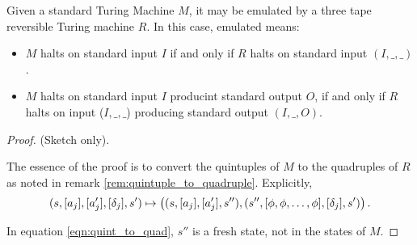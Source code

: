 \begin{theorem}\label{thm:reversible_turing_machine_emulates_standard}
  Given a standard Turing Machine $M$, it may be emulated by a three tape reversible
  Turing machine $R$. In this case, emulated means:
  \begin{itemize}
    \item $M$ halts on standard input $I$ if and only if $R$ halts on standard input $(I,\_,\_)$.
    \item $M$ halts on standard input $I$ producint standard output $O$,
      if and only if $R$ halts on input ($I,\_,\_$) producing standard output $(I,\_,O)$.
  \end{itemize}
\end{theorem}
\begin{proof}
  (Sketch only).

  The essence of the proof is to convert the quintuples of $M$ to the quadruples of
  $R$ as noted in remark \ref{rem:quintuple_to_quadruple}. Explicitly,
  \begin{align}
    (s,[a_j],[a'_j],[\delta_j],s') \mapsto \left((s,[a_j],[a'_j],s''),
          (s'',[\phi,\phi,\ldots,\phi],[\delta_j],s')\right).\label{eqn:quint_to_quad}
  \end{align}

  In equation \eqref{eqn:quint_to_quad}, $s''$ is a fresh state, not in the states of $M$.
\end{proof}


